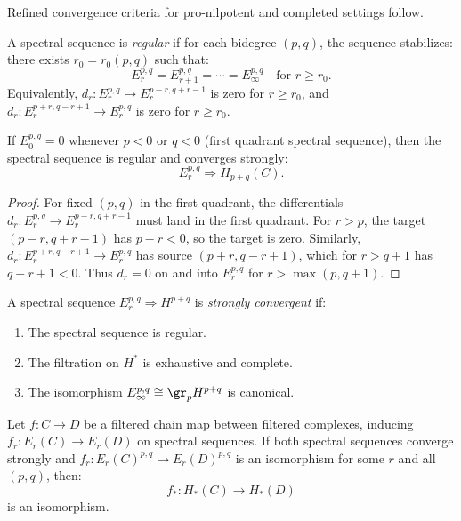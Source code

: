 Refined convergence criteria for pro-nilpotent and completed settings follow.

\begin{definition}
\label{def:regular-ss}
A spectral sequence is \emph{regular} if for each bidegree $(p, q)$, the 
sequence stabilizes: there exists $r_0 = r_0(p, q)$ such that:
\[
E_r^{p,q} = E_{r+1}^{p,q} = \cdots = E_\infty^{p,q} \quad \text{for } r \geq r_0.
\]
Equivalently, $d_r: E_r^{p,q} \to E_r^{p-r, q+r-1}$ is zero for $r \geq r_0$, 
and $d_r: E_r^{p+r, q-r+1} \to E_r^{p,q}$ is zero for $r \geq r_0$.
\end{definition}

\begin{proposition}
\label{prop:first-quadrant}
If $E_0^{p,q} = 0$ whenever $p < 0$ or $q < 0$ (first quadrant spectral sequence), 
then the spectral sequence is regular and converges strongly:
\[
E_r^{p,q} \Rightarrow H_{p+q}(C).
\]
\end{proposition}

\begin{proof}
For fixed $(p, q)$ in the first quadrant, the differentials $d_r: E_r^{p,q} \to 
E_r^{p-r, q+r-1}$ must land in the first quadrant. For $r > p$, the target 
$(p-r, q+r-1)$ has $p - r < 0$, so the target is zero. Similarly, 
$d_r: E_r^{p+r, q-r+1} \to E_r^{p,q}$ has source $(p+r, q-r+1)$, which for 
$r > q+1$ has $q - r + 1 < 0$. Thus $d_r = 0$ on and into $E_r^{p,q}$ for 
$r > \max(p, q+1)$.
\end{proof}

\begin{definition}
\label{def:strong-convergence}
A spectral sequence $E_r^{p,q} \Rightarrow H^{p+q}$ is \emph{strongly convergent} 
if:
\begin{enumerate}[label=(\roman*)]
\item The spectral sequence is regular.
\item The filtration on $H^*$ is exhaustive and complete.
\item The isomorphism $E_\infty^{p,q} \cong \gr_p H^{p+q}$ is canonical.
\end{enumerate}
\end{definition}

\begin{theorem}
\label{thm:zeeman}
Let $f: C \to D$ be a filtered chain map between filtered complexes, inducing 
$f_r: E_r(C) \to E_r(D)$ on spectral sequences. If both spectral sequences 
converge strongly and $f_r: E_r(C)^{p,q} \to E_r(D)^{p,q}$ is an isomorphism 
for some $r$ and all $(p, q)$, then:
\[
f_*: H_*(C) \to H_*(D)
\]
is an isomorphism.
\end{theorem}

